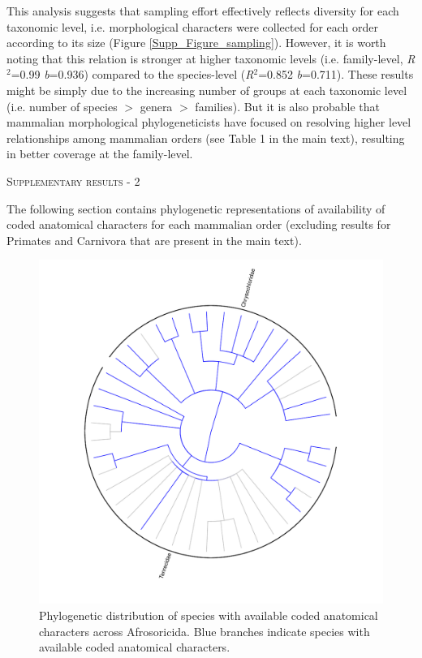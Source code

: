 \documentclass[12pt,letterpaper]{article}
\renewcommand{\section}[1]{%
\bigskip
\begin{center}
\begin{Large}
\normalfont\scshape #1
\medskip
\end{Large}
\end{center}}
\begin{document}
This analysis suggests that sampling effort effectively reflects diversity for each taxonomic level, i.e. morphological characters were collected for each order according to its size (Figure \ref{Supp_Figure_sampling}).
However, it is worth noting that this relation is stronger at higher taxonomic levels (i.e. family-level, \textit{R$^2$}=0.99 \textit{b}=0.936) compared to the species-level (\textit{R$^2$}=0.852 \textit{b}=0.711).
These results might be simply due to the increasing number of groups at each taxonomic level (i.e. number of species $>$ genera $>$ families).
But it is also probable that mammalian morphological phylogeneticists have focused on resolving higher level relationships among mammalian orders (see Table 1 in the main text), resulting in better coverage at the family-level.

\newpage

\section{Supplementary results - 2}
The following section contains phylogenetic representations of availability of coded anatomical characters for each mammalian order (excluding results for Primates and Carnivora that are present in the main text).

\begin{figure}[!htbp]
\centering
    \includegraphics[width=1\textwidth]{Supp_figure_AFROSORICIDA.pdf}
\caption{Phylogenetic distribution of species with available coded anatomical characters across Afrosoricida. Blue branches indicate species with available coded anatomical characters.}
\label{Supp_Figure_Phylo-Afrosoricida}
\end{figure}
\end{document}
